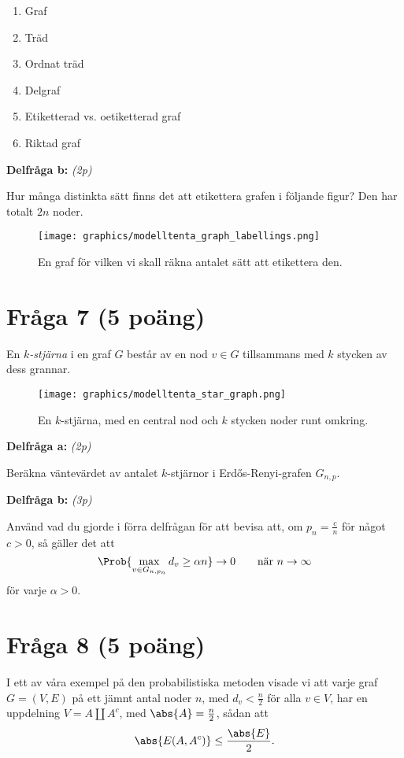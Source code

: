 \documentclass[nobib]{tufte-handout}
\begin{document}
\begin{enumerate}
    \item Graf
    \item Träd
    \item Ordnat träd
    \item Delgraf
    \item Etiketterad vs. oetiketterad graf
    \item Riktad graf
\end{enumerate}

\noindent\textbf{Delfråga b:} \emph{(2p)}

Hur många distinkta sätt finns det att etikettera grafen i följande figur? Den har totalt $2n$ noder.

\begin{figure}
    \centering
    \texttt{[image: graphics/modelltenta\_graph\_labellings.png]}
    \caption{En graf för vilken vi skall räkna antalet sätt att etikettera den.}
\end{figure}

\section{Fråga 7 (5 poäng)} %

En \emph{$k$-stjärna} i en graf $G$ består av en nod $v\in G$ tillsammans med $k$ stycken av dess grannar.

\begin{figure}
    \centering
    \texttt{[image: graphics/modelltenta\_star\_graph.png]}
    \caption{En $k$-stjärna, med en central nod och $k$ stycken noder runt omkring.}
\end{figure}

\noindent\textbf{Delfråga a:} \emph{(2p)}

Beräkna väntevärdet av antalet $k$-stjärnor i Erd\H{o}s-Renyi-grafen $G_{n,p}$.

\noindent\textbf{Delfråga b:} \emph{(3p)}

Använd vad du gjorde i förra delfrågan för att bevisa att, om $p_n = \frac{c}{n}$ för något $c > 0$, så gäller det att
$$\Prob{\max_{v \in G_{n,p_n}} d_v \geq \alpha n} \to 0\qquad\text{när }n\to\infty$$
för varje $\alpha > 0$.

\section{Fråga 8 (5 poäng)} %

I ett av våra exempel på den probabilistiska metoden visade vi att varje graf $G = (V, E)$ på ett jämnt antal noder $n$, med $d_v < \frac{n}{2}$ för alla $v \in V$, har en uppdelning $V = A \coprod A^c$, med $\abs{A} = \frac{n}{2}$, sådan att
$$\abs{E(A, A^c)} \leq \frac{\abs{E}}{2}.$$
\end{document}

